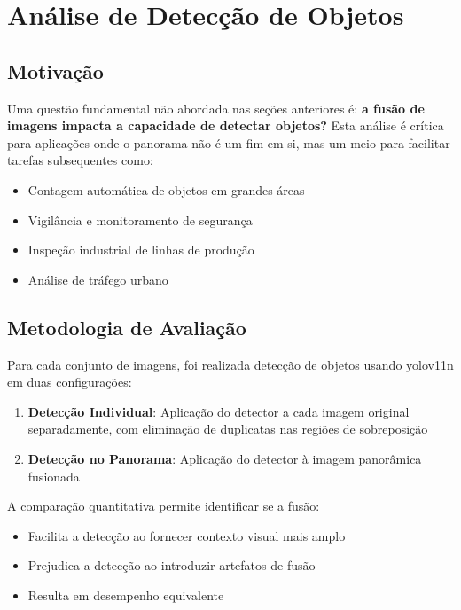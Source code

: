 \section{Análise de Detecção de Objetos} \label{sec:video-detection}

\subsection{Motivação}

Uma questão fundamental não abordada nas seções anteriores é: \textbf{a fusão de imagens impacta a capacidade de detectar objetos?} Esta análise é crítica para aplicações onde o panorama não é um fim em si, mas um meio para facilitar tarefas subsequentes como:

\begin{itemize}
    \item Contagem automática de objetos em grandes áreas
    \item Vigilância e monitoramento de segurança
    \item Inspeção industrial de linhas de produção
    \item Análise de tráfego urbano
\end{itemize}

\subsection{Metodologia de Avaliação}

Para cada conjunto de imagens, foi realizada detecção de objetos usando \gls{yolo}v11n em duas configurações:

\begin{enumerate}
    \item \textbf{Detecção Individual}: Aplicação do detector a cada imagem original separadamente, com eliminação de duplicatas nas regiões de sobreposição
    \item \textbf{Detecção no Panorama}: Aplicação do detector à imagem panorâmica fusionada
\end{enumerate}

A comparação quantitativa permite identificar se a fusão:
\begin{itemize}
    \item Facilita a detecção ao fornecer contexto visual mais amplo
    \item Prejudica a detecção ao introduzir artefatos de fusão
    \item Resulta em desempenho equivalente
\end{itemize}


